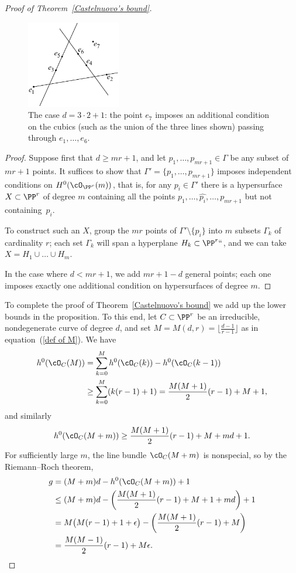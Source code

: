 \begin{proof}[Proof of Theorem~\ref{Castelnuovo's bound}]
\begin{figure}
\centerline {\includegraphics[height=1.5in]{"main/Fig09-3"}}
\caption{The case $d = 3\cdot 2+1$: the point $e_{7}$ imposes an additional
condition on the cubics (such as the union of the three lines shown)
passing through
$e_{1},\dots, e_{6}$.}
\label{Fig9.3}
\end{figure}

\begin{proof}
Suppose first that $d \geq mr+1$, and let $p_1,\dots,p_{mr+1} \in
\Gamma$ be any subset of $mr+1$ points. It suffices to show that
$\Gamma' = \{p_1,\dots,p_{mr+1}\}$ imposes independent conditions 
on
$H^0(\cO_{\PP^r}(m))$, that is, for any $p_i \in \Gamma'$ there is a
hypersurface $X \subset \PP^r$ of degree $m$ containing all the points
$p_1,\dots, \hat{p_i},\dots,p_{mr+1}$ but not containing~$p_i$.

To construct such an $X$, group the $mr$ points of $\Gamma' \setminus
\{p_i\}$ into $m$ subsets $\Gamma_k$ of cardinality $r$; each set
$\Gamma_k$ will span a hyperplane $H_k \subset \PP^r` `$, and we can
take $X = H_1 \cup \dots \cup H_m$.

In the case where $d<mr+1$, we add $mr+1-d$ general points; each one
imposes exactly one
additional condition on hypersurfaces of degree $m$.
\end{proof}


To complete the proof of Theorem~\ref{Castelnuovo's bound} we add up the
lower bounds in the proposition. To this end, let $C \subset \PP^r$ be
 an irreducible, nondegenerate curve of degree $d$, and  set
$M= M(d,r) = \bigl\lfloor{\frac{d-1}{r-1}}\bigr\rfloor$ 
as in equation~(\ref{def of M}).
We have
\begin{align*}
h^0(\cO_C(M)) &= \sum_{k=0}^M h^0(\cO_C(k)) - h^0(\cO_C(k-1)) \\
&\geq  \sum_{k=0}^M (k(r-1)+1) 
= \frac{M(M+1)}{2}(r-1) + M + 1
,
\end{align*}
and similarly
$$
h^0(\cO_C(M+m)) \geq \frac{M(M+1)}{2}(r-1) + M  + md+ 1
.
$$
For sufficiently large $m$, the line bundle $\cO_C(M+m)$ is nonspecial,
so by the 
Riemann--Roch theorem,
%
\begin{align*}
g &= (M+m)d - h^0(\cO_C(M+m)) + 1 \\
&\leq (M+m)d - \left(  \frac{M(M+1)}{2}(r-1) + M + 1 + md \right)+1 \\
& = M\bigl( M(r-1) + 1 + \epsilon \bigr) - \left(  \frac{M(M+1)}{2}(r-1)
+ M  \right) \\
&= \frac{M(M-1)}{2}(r-1) + M\epsilon.
\end{align*}



\end{proof}
